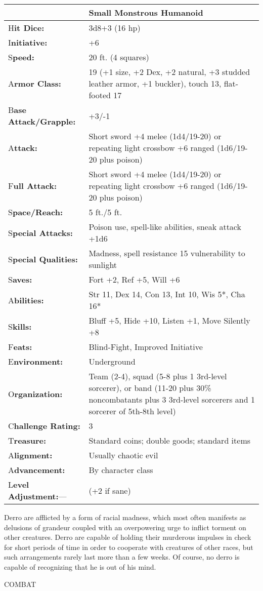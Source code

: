 \documentclass{article}
\begin{document}
\begin{tabular}{|>{\raggedright}p{91pt}|>{\raggedright}p{204pt}|}
\hline
  & Small Monstrous Humanoid\tabularnewline
\hline
H\textbf{it Dice:} & 3d8+3 (16 hp)\tabularnewline
\hline
I\textbf{nitiative:} & +6\tabularnewline
\hline
S\textbf{peed:} & 20 ft. (4 squares)\tabularnewline
\hline
A\textbf{rmor Class:} & 19 (+1 size, +2 Dex, +2 natural, +3 studded leather armor, 
+1 buckler), touch 13, flat-footed 17\tabularnewline
\hline
B\textbf{ase Attack/Grapple:} & +3/-1\tabularnewline
\hline
A\textbf{ttack:} & Short sword +4 melee (1d4/19-20) or repeating light crossbow 
+6 ranged (1d6/19-20 plus poison)\tabularnewline
\hline
F\textbf{ull Attack:} & Short sword +4 melee (1d4/19-20) or repeating light crossbow 
+6 ranged (1d6/19-20 plus poison)\tabularnewline
\hline
S\textbf{pace/Reach:} & 5 ft./5 ft.\tabularnewline
\hline
S\textbf{pecial Attacks:} & Poison use, spell-like abilities, sneak attack +1d6\tabularnewline
\hline
S\textbf{pecial Qualities:} & Madness, spell resistance 15 vulnerability to sunlight\tabularnewline
\hline
S\textbf{aves:} & Fort +2, Ref +5, Will +6\tabularnewline
\hline
A\textbf{bilities:} & Str 11, Dex 14, Con 13, Int 10, Wis 5*, Cha 16*\tabularnewline
\hline
S\textbf{kills:} & Bluff +5, Hide +10, Listen +1, Move Silently +8\tabularnewline
\hline
F\textbf{eats:} & Blind-Fight, Improved Initiative\tabularnewline
\hline
E\textbf{nvironment:} & Underground\tabularnewline
\hline
O\textbf{rganization:} & Team (2-4), squad (5-8 plus 1 3rd-level sorcerer), or 
band (11-20 plus 30\% noncombatants plus 3 3rd-level sorcerers and 1 sorcerer of 
5th-8th level)\tabularnewline
\hline
C\textbf{hallenge Rating:} & 3\tabularnewline
\hline
T\textbf{reasure:} & Standard coins; double goods; standard items\tabularnewline
\hline
A\textbf{lignment:} & Usually chaotic evil\tabularnewline
\hline
A\textbf{dvancement:} & By character class\tabularnewline
\hline
L\textbf{evel Adjustment:}--- &  (+2 if sane)\tabularnewline
\hline
\end{tabular}

Derro are afflicted by a form of racial madness, which most often manifests as 
delusions of grandeur coupled with an overpowering urge to inflict torment on other 
creatures. Derro are capable of holding their murderous impulses in check for short 
periods of time in order to cooperate with creatures of other races, but such arrangements 
rarely last more than a few weeks. Of course, no derro is capable of recognizing 
that he is out of his mind.

COMBAT
\end{document}

